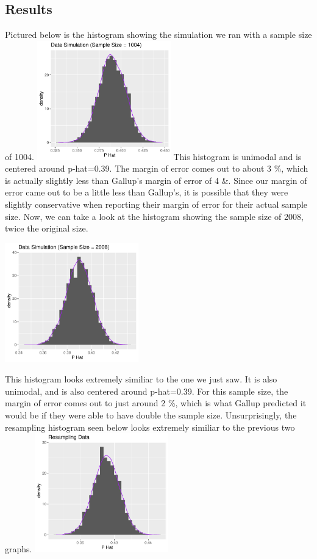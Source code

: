 \documentclass{article}\usepackage[]{graphicx}\usepackage[]{xcolor}
\begin{document}
\begin{multicols}{2}
\section{Results}
Pictured below is the histogram showing the simulation we ran with a sample size of 1004.
\includegraphics[width=0.435\textwidth]{hhhh.pdf}
\indent 
This histogram is unimodal and is centered around p-hat=0.39. The margin of error comes out to about 3 \%, which is actually slightly less than Gallup's margin of error of 4 \&. Since our margin of error came out to be a little less than Gallup's, it is possible that they were slightly conservative when reporting their margin of error for their actual sample size.
\newline
\indent 
Now, we can take a look at the histogram showing the sample size of 2008, twice the original size.
\begin{center}
  \includegraphics[width=0.435\textwidth]{2008sample.pdf}
\end{center}
\indent 
This histogram looks extremely similiar to the one we just saw. It is also unimodal, and is also centered around p-hat=0.39. For this sample size, the margin of error comes out to just around 2 \%, which is what Gallup predicted it would be if they were able to have double the sample size.
\newline
\indent
Unsurprisingly, the resampling histogram seen below looks extremely similiar to the previous two graphs.
\includegraphics[width=0.435\textwidth]{resampling.pdf}

\end{multicols}
\end{document}
